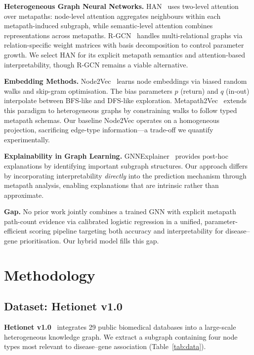 \documentclass{article}
\begin{document}
\textbf{Heterogeneous Graph Neural Networks.} HAN~\citep{wang2019han} uses two-level attention over metapaths: node-level attention aggregates neighbours within each metapath-induced subgraph, while semantic-level attention combines representations across metapaths. R-GCN~\citep{schlichtkrull2018rgcn} handles multi-relational graphs via relation-specific weight matrices with basis decomposition to control parameter growth. We select HAN for its explicit metapath semantics and attention-based interpretability, though R-GCN remains a viable alternative.

\textbf{Embedding Methods.} Node2Vec~\citep{grover2016node2vec} learns node embeddings via biased random walks and skip-gram optimisation. The bias parameters $p$ (return) and $q$ (in-out) interpolate between BFS-like and DFS-like exploration. Metapath2Vec~\citep{dong2017metapath2vec} extends this paradigm to heterogeneous graphs by constraining walks to follow typed metapath schemas. Our baseline Node2Vec operates on a homogeneous projection, sacrificing edge-type information---a trade-off we quantify experimentally.

\textbf{Explainability in Graph Learning.} GNNExplainer~\citep{ying2019gnnexplainer} provides post-hoc explanations by identifying important subgraph structures. Our approach differs by incorporating interpretability \textit{directly} into the prediction mechanism through metapath analysis, enabling explanations that are intrinsic rather than approximate.

\textbf{Gap.} No prior work jointly combines a trained GNN with explicit metapath path-count evidence via calibrated logistic regression in a unified, parameter-efficient scoring pipeline targeting both accuracy and interpretability for disease--gene prioritisation. Our hybrid model fills this gap.

\section{Methodology}
\label{sec:methodology}

\subsection{Dataset: Hetionet v1.0}

\textbf{Hetionet v1.0}~\citep{himmelstein2017} integrates 29 public biomedical databases into a large-scale heterogeneous knowledge graph. We extract a subgraph containing four node types most relevant to disease--gene association (Table~\ref{tab:data}).
\end{document}
